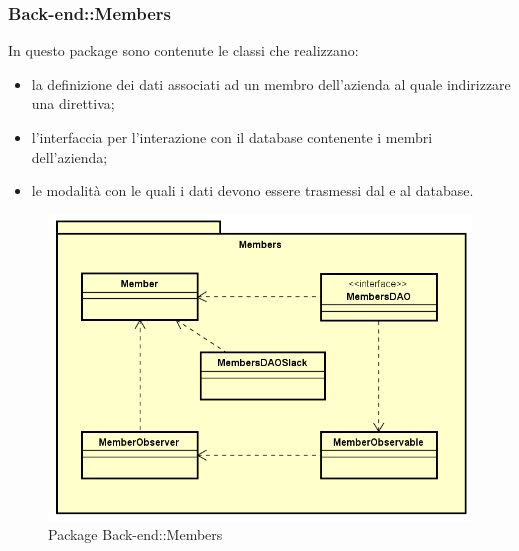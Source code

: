 \subsubsection{Back-end::Members}
In questo package sono contenute le classi che realizzano:
\begin{itemize}
\item la definizione dei dati associati ad un membro dell'azienda al quale indirizzare una direttiva;
\item l'interfaccia per l'interazione con il database contenente i membri dell'azienda;
\item le modalità con le quali i dati devono essere trasmessi dal e al database.
\end{itemize}
\begin{figure}[h] \centering \includegraphics[width=\textwidth,height=\textheight,keepaspectratio]{images/diagrams/back-end/Official_Backend_0304/Member.png}
	\caption{Package Back-end::Members}
\end{figure}
